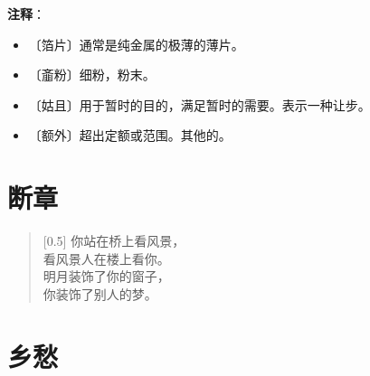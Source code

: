 \documentclass[12pt,UTF-8,openany]{ctexbook}
\begin{document}
\newpage

\textbf{注释}：

\vspace{-1em}

\begin{itemize}
    \setlength\itemsep{-0.2em}
    \item 〔箔片〕通常是纯金属的极薄的薄片。
    \item 〔齑粉〕细粉，粉末。
    \item 〔姑且〕用于暂时的目的，满足暂时的需要。表示一种让步。
    \item 〔额外〕超出定额或范围。其他的。
\end{itemize}

\chapter{断章}

\begin{normalsize}
    
    \begin{verse}[0.5\linewidth]
        你站在桥上看风景， \\
        看风景人在楼上看你。 \\
        明月装饰了你的窗子， \\
        你装饰了别人的梦。
    \end{verse}
    
\end{normalsize}



\chapter{乡愁}
\end{document}

